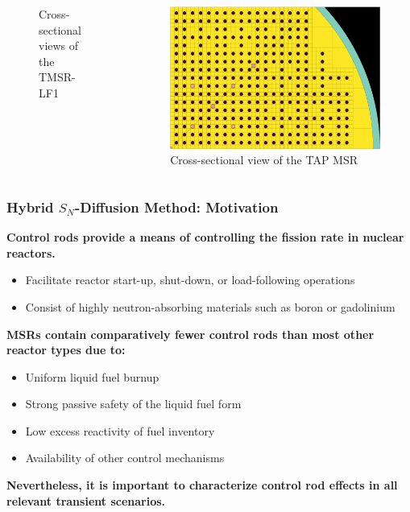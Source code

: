 \begin{frame}
\begin{columns}
\begin{figure}
      \caption{\footnotesize Cross-sectional views of the TMSR-LF1
      \cite{liu_sensitivityuncertainty_2020}}
    \end{figure}
    \begin{figure}
      \centering
      \includegraphics[width=.5\columnwidth]{images/tap-msr-rods}
      \caption{\footnotesize Cross-sectional view of the TAP MSR \cite{lee_neutronics_2020}}
    \end{figure}
    \hfill
  \end{columns}
\end{frame}

\begin{frame}
  \frametitle{Hybrid $S_N$-Diffusion Method: Motivation}
  \textbf{Control rods provide a means of controlling the fission rate in nuclear reactors.} 
  \begin{itemize}
    \item Facilitate reactor start-up, shut-down, or load-following operations
    \item Consist of highly neutron-absorbing materials such as boron or gadolinium
  \end{itemize}
  \textbf{MSRs contain comparatively fewer control rods than most other reactor types due to:}
  \begin{itemize}
    \item Uniform liquid fuel burnup
    \item Strong passive safety of the liquid fuel form
    \item Low excess reactivity of fuel inventory
    \item Availability of other control mechanisms
  \end{itemize}
  \pause
  \textbf{Nevertheless, it is important to characterize control rod effects in all relevant
  transient scenarios.}
\end{frame}

